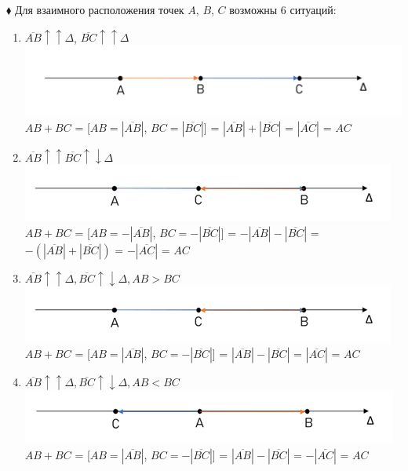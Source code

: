 \documentclass[a4paper, 12pt]{report}
\begin{document}
	\begin{flushleft}
		$\blacklozenge$ \quad{}
		Для взаимного расположения точек $A$, $B$, $C$ возможны 6 ситуаций:
	\end{flushleft}
	\begin{enumerate}
		\item $\overline{AB} \uparrow\uparrow \Delta$, $\overline{BC} \uparrow\uparrow \Delta$\\
		\includegraphics{img/conapr1.png}\\
		$AB+BC$ = [$AB = |\overline{AB}|$, $BC = |\overline{BC}|$] = $|\overline{AB}|+|\overline{BC}|$ = $|\overline{AC}|$ = $AC$\\
		
		\item $\overline{AB} \uparrow\uparrow \overline{BC} \uparrow\downarrow \Delta$\\
		\includegraphics{img/conapr2.png}\\
		$AB+BC$ = [$AB = -|\overline{AB}|$, $BC = -|\overline{BC}|$] = $-|\overline{AB}|-|\overline{BC}|$ = $-(|\overline{AB}|+|\overline{BC}|)$ = $-|\overline{AC}|$ = $AC$\\
		
		\item $\overline{AB} \uparrow\uparrow \Delta, \overline{BC} \uparrow\downarrow \Delta, AB > BC$\\
		\includegraphics{img/conapr3.png}\\
		$AB+BC$ = [$AB = |\overline{AB}|$, $BC = -|\overline{BC}|$] = $|\overline{AB}|-|\overline{BC}|$ = $|\overline{AC}|$ = $AC$\\
		
		\item $\overline{AB} \uparrow\uparrow \Delta, \overline{BC} \uparrow\downarrow \Delta, AB < BC$\\
		\includegraphics{img/conapr4.png}\\
		$AB+BC$ = [$AB = |\overline{AB}|$, $BC = -|\overline{BC}|$] = $|\overline{AB}|-|\overline{BC}|$ = $-|\overline{AC}|$ = $AC$\\
		

\end{enumerate}
\end{document}
